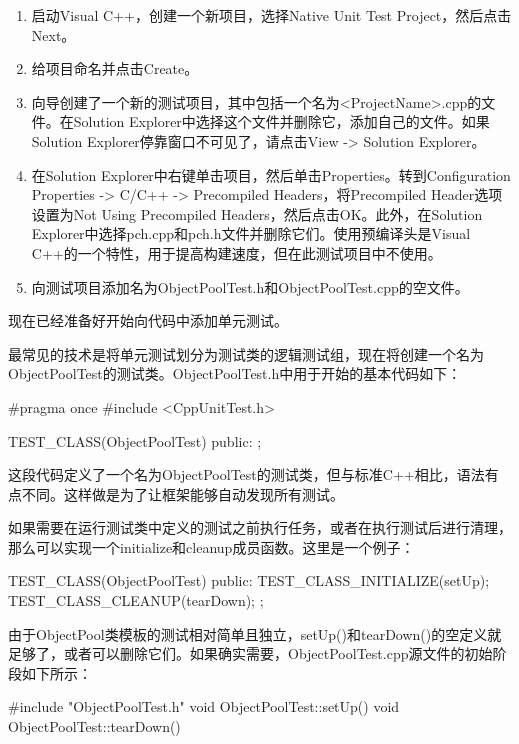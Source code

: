 \begin{enumerate}
\item
启动Visual C++，创建一个新项目，选择Native Unit Test Project，然后点击Next。

\item
给项目命名并点击Create。

\item
向导创建了一个新的测试项目，其中包括一个名为<ProjectName>.cpp的文件。在Solution Explorer中选择这个文件并删除它，添加自己的文件。如果Solution Explorer停靠窗口不可见了，请点击View -> Solution Explorer。

\item
在Solution Explorer中右键单击项目，然后单击Properties。转到Configuration Properties -> C/C++ -> Precompiled Headers，将Precompiled Header选项设置为Not Using Precompiled Headers，然后点击OK。此外，在Solution Explorer中选择pch.cpp和pch.h文件并删除它们。使用预编译头是Visual C++的一个特性，用于提高构建速度，但在此测试项目中不使用。

\item
向测试项目添加名为ObjectPoolTest.h和ObjectPoolTest.cpp的空文件。
\end{enumerate}

现在已经准备好开始向代码中添加单元测试。

最常见的技术是将单元测试划分为测试类的逻辑测试组，现在将创建一个名为ObjectPoolTest的测试类。ObjectPoolTest.h中用于开始的基本代码如下：

\begin{cpp}
#pragma once
#include <CppUnitTest.h>

TEST_CLASS(ObjectPoolTest)
{
    public:
};
\end{cpp}

这段代码定义了一个名为ObjectPoolTest的测试类，但与标准C++相比，语法有点不同。这样做是为了让框架能够自动发现所有测试。

如果需要在运行测试类中定义的测试之前执行任务，或者在执行测试后进行清理，那么可以实现一个initialize和cleanup成员函数。这里是一个例子：

\begin{cpp}
TEST_CLASS(ObjectPoolTest)
{
    public:
        TEST_CLASS_INITIALIZE(setUp);
        TEST_CLASS_CLEANUP(tearDown);
};
\end{cpp}

由于ObjectPool类模板的测试相对简单且独立，setUp()和tearDown()的空定义就足够了，或者可以删除它们。如果确实需要，ObjectPoolTest.cpp源文件的初始阶段如下所示：

\begin{cpp}
#include "ObjectPoolTest.h"
void ObjectPoolTest::setUp() { }
void ObjectPoolTest::tearDown() { }
\end{cpp}

